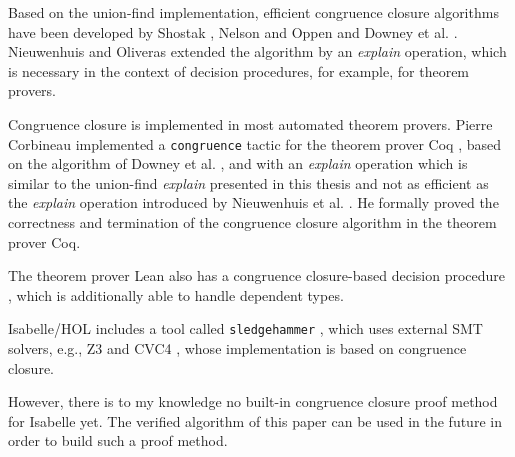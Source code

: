 Based on the union-find implementation, efficient congruence closure algorithms have been developed by Shostak \cite{congruenceclosure-og2}, Nelson and Oppen \cite{congruenceclosure-og} and Downey et al. \cite{congruenceclosure-og3}.
Nieuwenhuis and Oliveras \cite{Nieuwenhuis} extended the algorithm by an \emph{explain} operation, which is necessary in the context of decision procedures, for example, for theorem provers.

Congruence closure is implemented in most automated theorem provers. Pierre Corbineau implemented a \lstinline|congruence| tactic for the theorem prover Coq \cite{congruenceclosure-coq, congruence-coq}, based on the algorithm of Downey et al. \cite{congruenceclosure-og3}, and with an \emph{explain} operation which is similar to the union-find \emph{explain} presented in this thesis and not as efficient as the \emph{explain} operation introduced by Nieuwenhuis et al. \cite{Nieuwenhuis}. He formally proved the correctness and termination of the congruence closure algorithm in the theorem prover Coq.

The theorem prover Lean also has a congruence closure-based decision procedure \cite{congruenceclosure-lean}, which is additionally able to handle dependent types.

Isabelle/HOL includes a tool called \lstinline|sledgehammer| \cite{sledgehammer}, which uses external SMT solvers, e.g., Z3 \cite{z3} and CVC4 \cite{cvc4}, whose implementation is based on congruence closure.

However, there is to my knowledge no built-in congruence closure proof method for Isabelle yet. The verified algorithm of this paper can be used in the future in order to build such a proof method.
